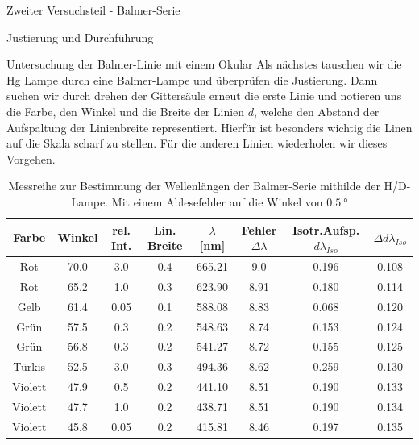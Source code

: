 \documentclass[pdftex, a4paper,11pt, twoside, ngerman]{report}
\begin{document}
\begin{chapter}{Zweiter Versuchsteil - Balmer-Serie}
\begin{section}{Justierung und Durchführung}
      \begin{subsection}{Untersuchung der Balmer-Linie mit einem Okular}
        \label{chp:Balmer:sec:JusitierungDurchfuehrung:subsec:Okular}
        Als nächstes tauschen wir die Hg Lampe durch eine Balmer-Lampe und
        überprüfen die Justierung. Dann suchen wir durch drehen der Gittersäule
        erneut die erste Linie und notieren uns die Farbe, den Winkel und die
        Breite der Linien $d$, welche den Abstand der Aufspaltung der
        Linienbreite representiert. Hierfür ist besonders wichtig die Linen
        auf die Skala scharf zu stellen. Für die anderen Linien wiederholen
        wir dieses Vorgehen.
         
        \begin{table}[htbp]
          \centering
          \footnotesize
          \begin{tabular}{|c|c|c|c|c|c|c|c|}
            \hline
            Farbe & Winkel & rel. Int. & Lin. Breite & $\lambda$ 
                [nm] & Fehler $\Delta \lambda$ & Isotr.Aufsp. 
                $d\lambda_{Iso}$ & $\Delta d\lambda_{Iso}$ \\ \hline \hline 
            Rot & 70.0 & 3.0 & 0.4 & 665.21 & 9.0 & 0.196 & 0.108 \\ \hline 
            Rot & 65.2 & 1.0 & 0.3 & 623.90 & 8.91 & 0.180 & 0.114 \\ \hline 
            Gelb & 61.4 & 0.05 & 0.1 & 588.08 & 8.83 & 0.068 & 0.120 \\ \hline 
            Grün & 57.5 & 0.3 & 0.2 & 548.63 & 8.74 & 0.153 & 0.124 \\ \hline 
            Grün & 56.8 & 0.3 & 0.2 & 541.27 & 8.72 & 0.155 & 0.125 \\ \hline 
            Türkis & 52.5 & 3.0 & 0.3 & 494.36 & 8.62 & 0.259 & 0.130 \\ \hline
            Violett & 47.9 & 0.5 & 0.2 & 441.10 & 8.51 & 0.190 & 0.133 \\ 
                \hline 
            Violett & 47.7 & 1.0 & 0.2 & 438.71 & 8.51 & 0.190 & 0.134 \\ 
                \hline 
            Violett & 45.8 & 0.05 & 0.2 & 415.81 & 8.46 & 0.197 & 0.135 \\ 
                \hline 
          \end{tabular}
          \caption{Messreihe zur Bestimmung der Wellenlängen der Balmer-Serie 
              mithilde der H/D-Lampe. Mit einem Ablesefehler auf die Winkel 
              von $\SI{0.5}{\degree}$}
          \label{tab:BalmerserieOkular}
        \end{table}


\end{subsection}
\end{section}
\end{chapter}
\end{document}
